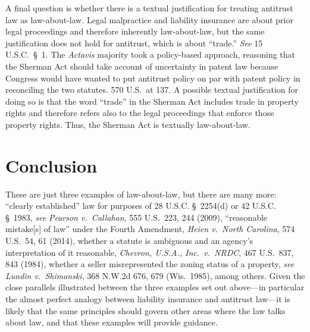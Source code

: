 \documentclass[
  12pt,
  letterpaper,
]{scrartcl}
\begin{document}
A final question is whether there is a textual justification for treating
antitrust law as law-about-law. Legal malpractice and liability insurance are
about prior legal proceedings and therefore inherently law-about-law, but the
same justification does not hold for antitrust, which is about ``trade.''
\textit{See} 15 U.S.C.~§~1. The \textit{Actavis} majority took a policy-based
approach, reasoning that the Sherman Act should take account of uncertainty in
patent law because Congress would have wanted to put antitrust policy on par
with patent policy in reconciling the two statutes. 570 U.S.~at 137. A possible
textual justification for doing so is that the word ``trade'' in the Sherman
Act includes trade in property rights and therefore refers also to the legal
proceedings that enforce those property rights. Thus, the Sherman Act is
textually law-about-law.


\section{Conclusion}

These are just three examples of law-about-law, but there are many more:
``clearly established'' law for purposes of 28 U.S.C. § 2254(d) or 42 U.S.C.
§ 1983, \textit{see} \textit{Pearson v.~Callahan}, 555 U.S.~223, 244 (2009),
``reasonable mistake[s] of law'' under the Fourth Amendment, \textit{Heien
v.~North Carolina}, 574 U.S.~54, 61 (2014), whether a statute is ambiguous and
an agency's interpretation of it reasonable, \textit{Chevron, U.S.A.,
Inc.~v.~NRDC}, 467 U.S.~837, 843 (1984), whether a seller misrepresented the
zoning status of a property, \textit{see} \textit{Lundin v.~Shimanski}, 368
N.W.2d 676, 679 (Wis.~1985), among others. Given the close parallels
illustrated between the three examples set out above---in particular the almost
perfect analogy between liability insurance and antitrust law---it is likely
that the same principles should govern other areas where the law talks about
law, and that these examples will provide guidance.
\end{document}
